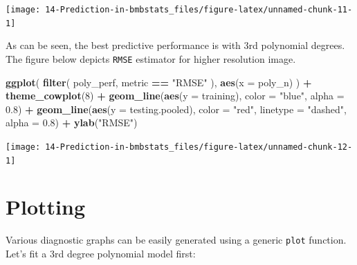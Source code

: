 \documentclass[
]{book}
\newenvironment{Shaded}{\begin{snugshade}}{\end{snugshade}}
\newcommand{\DataTypeTok}[1]{\textcolor[rgb]{0.13,0.29,0.53}{#1}}
\newcommand{\DecValTok}[1]{\textcolor[rgb]{0.00,0.00,0.81}{#1}}
\newcommand{\FloatTok}[1]{\textcolor[rgb]{0.00,0.00,0.81}{#1}}
\newcommand{\KeywordTok}[1]{\textcolor[rgb]{0.13,0.29,0.53}{\textbf{#1}}}
\newcommand{\NormalTok}[1]{#1}
\newcommand{\OperatorTok}[1]{\textcolor[rgb]{0.81,0.36,0.00}{\textbf{#1}}}
\newcommand{\StringTok}[1]{\textcolor[rgb]{0.31,0.60,0.02}{#1}}
\begin{document}
\begin{center}\texttt{[image: 14-Prediction-in-bmbstats\_files/figure-latex/unnamed-chunk-11-1]} \end{center}

As can be seen, the best predictive performance is with 3rd polynomial degrees. The figure below depicts \texttt{RMSE} estimator for higher resolution image.

\begin{Shaded}
\begin{Highlighting}[]
\KeywordTok{ggplot}\NormalTok{(}
  \KeywordTok{filter}\NormalTok{(}
\NormalTok{    poly\_perf,}
\NormalTok{    metric }\OperatorTok{==}\StringTok{ "RMSE"}
\NormalTok{  ),}
  \KeywordTok{aes}\NormalTok{(}\DataTypeTok{x =}\NormalTok{ poly\_n)}
\NormalTok{) }\OperatorTok{+}
\StringTok{  }\KeywordTok{theme\_cowplot}\NormalTok{(}\DecValTok{8}\NormalTok{) }\OperatorTok{+}
\StringTok{  }\KeywordTok{geom\_line}\NormalTok{(}\KeywordTok{aes}\NormalTok{(}\DataTypeTok{y =}\NormalTok{ training), }\DataTypeTok{color =} \StringTok{"blue"}\NormalTok{, }\DataTypeTok{alpha =} \FloatTok{0.8}\NormalTok{) }\OperatorTok{+}
\StringTok{  }\KeywordTok{geom\_line}\NormalTok{(}\KeywordTok{aes}\NormalTok{(}\DataTypeTok{y =}\NormalTok{ testing.pooled), }\DataTypeTok{color =} \StringTok{"red"}\NormalTok{, }\DataTypeTok{linetype =} \StringTok{"dashed"}\NormalTok{, }\DataTypeTok{alpha =} \FloatTok{0.8}\NormalTok{) }\OperatorTok{+}
\StringTok{  }\KeywordTok{ylab}\NormalTok{(}\StringTok{"RMSE"}\NormalTok{)}
\end{Highlighting}
\end{Shaded}

\begin{center}\texttt{[image: 14-Prediction-in-bmbstats\_files/figure-latex/unnamed-chunk-12-1]} \end{center}

\hypertarget{plotting}{%
\section{Plotting}\label{plotting}}

Various diagnostic graphs can be easily generated using a generic \texttt{plot} function. Let's fit a 3rd degree polynomial model first:
\end{document}

